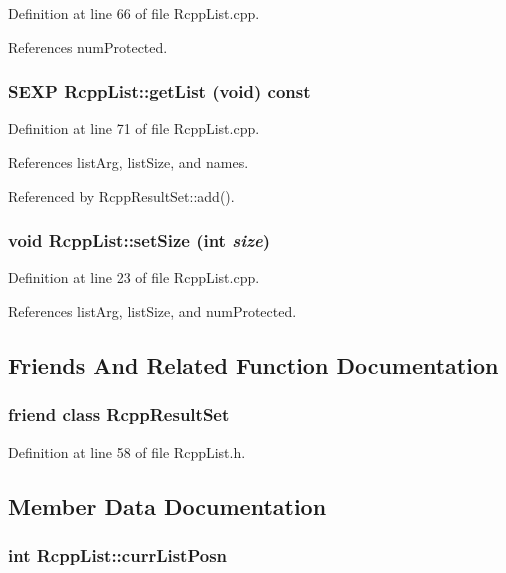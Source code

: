 Definition at line 66 of file RcppList.cpp.

References numProtected.\hypertarget{classRcppList_a0d983805932608efbab2afecfd547ec4}{
\subsubsection[{getList}]{\setlength{\rightskip}{0pt plus 5cm}SEXP RcppList::getList (void) const}}
\label{classRcppList_a0d983805932608efbab2afecfd547ec4}


Definition at line 71 of file RcppList.cpp.

References listArg, listSize, and names.

Referenced by RcppResultSet::add().\hypertarget{classRcppList_aa107c65834057ff79f5f8285ef5b1f3c}{
\subsubsection[{setSize}]{\setlength{\rightskip}{0pt plus 5cm}void RcppList::setSize (int {\em size})}}
\label{classRcppList_aa107c65834057ff79f5f8285ef5b1f3c}


Definition at line 23 of file RcppList.cpp.

References listArg, listSize, and numProtected.

\subsection{Friends And Related Function Documentation}
\hypertarget{classRcppList_a36944d83d40784eedc607fbb24a5e993}{
\subsubsection[{RcppResultSet}]{\setlength{\rightskip}{0pt plus 5cm}friend class {\bf RcppResultSet}}}
\label{classRcppList_a36944d83d40784eedc607fbb24a5e993}


Definition at line 58 of file RcppList.h.

\subsection{Member Data Documentation}
\hypertarget{classRcppList_a4b991902830e9f33eac03a42b2718195}{
\subsubsection[{currListPosn}]{\setlength{\rightskip}{0pt plus 5cm}int {\bf RcppList::currListPosn}}}
\label{classRcppList_a4b991902830e9f33eac03a42b2718195}


